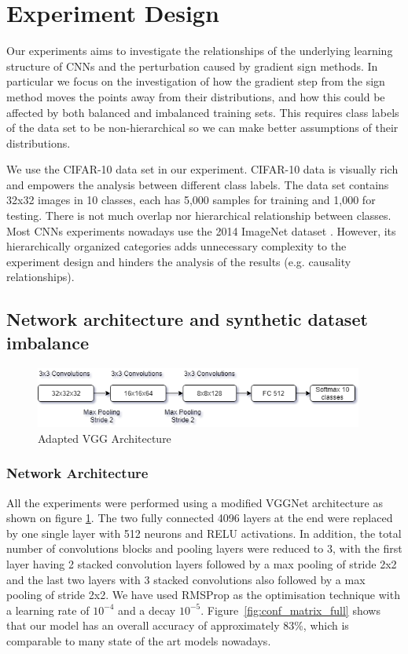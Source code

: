 \documentclass[runningheads,a4paper]{llncs}
\begin{document}
\section{Experiment Design}

Our experiments aims to investigate the relationships of the underlying learning structure of CNNs and the perturbation caused by gradient sign methods. In particular we focus on the investigation of how the gradient step from the sign method moves the points away from their distributions, and how this could be affected by both balanced and imbalanced training sets. This requires  class labels of the data set to be non-hierarchical so we can make better assumptions of their distributions. 

We use the CIFAR-10 data set \cite{krizhevsky_2009} in our experiment. CIFAR-10 data is visually rich and empowers the analysis between different class labels. The data set contains 32x32 images in 10 classes, each has 5,000 samples for training and 1,000 for testing. There is not much overlap nor hierarchical relationship between classes. Most CNNs experiments nowadays use the 2014 ImageNet dataset \cite{deng2009imagenet}. However, its hierarchically organized categories adds unnecessary complexity to the experiment design and hinders the analysis of the results (e.g. causality relationships).
\subsection{Network architecture and synthetic dataset imbalance}
\begin{figure}
	\centering
	\includegraphics[height=2.0cm]{net_diagram.png}
	\caption{Adapted VGG Architecture}
	\label{fig:vgg_arch}
\end{figure}

\subsubsection{Network Architecture} All the experiments were performed using a modified VGGNet \cite{simonyan2014very} architecture as shown on figure \ref{fig:vgg_arch}. The two fully connected 4096 layers at the end were replaced by one single layer with 512 neurons and RELU activations. In addition, the total number of convolutions blocks and pooling layers were reduced to 3, with the first layer having 2 stacked convolution layers followed by a max pooling of stride 2x2 and the last two layers with 3 stacked convolutions also followed by a max pooling of stride 2x2. We have used RMSProp  \cite{bengiormsprop} as the optimisation technique with a learning rate of $10^{-4}$ and a decay $10^{-5}$. Figure~\ref{fig:conf_matrix_full} shows that our model has an overall accuracy of approximately 83\%, which is comparable to many state of the art models nowadays.
\end{document}
